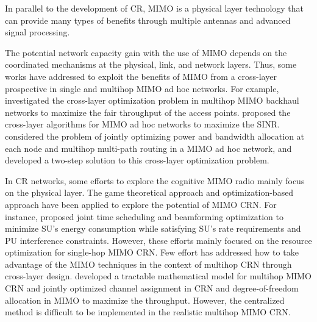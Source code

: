 \documentclass[12pt,onecolumn,tworows]{IEEEtran}
\begin{document}
In parallel to the development of CR, MIMO is a physical
layer technology that can provide many types of benefits through multiple antennas and advanced signal
processing.


The potential
network capacity gain with the use of MIMO depends on the
coordinated mechanisms at the physical, link, and network
layers\cite{Mietzner2006}. Thus, some works have addressed to exploit the benefits of MIMO from a cross-layer prospective in single and multihop MIMO ad hoc networks.
For example,
\cite{Kim2007} investigated the cross-layer optimization problem in
multihop
MIMO backhaul networks to maximize the fair throughput of the
access points.
\cite{Chu2008} proposed the cross-layer algorithms for
MIMO ad hoc networks to maximize the SINR.
\cite{LiuJSAC2008} considered the
problem of jointly optimizing power and bandwidth allocation
at each node and multihop multi-path routing in a MIMO
ad hoc network, and developed a two-step solution to this
cross-layer optimization problem.


In CR networks, some efforts to explore the cognitive MIMO radio mainly focus on the physical layer.
The game theoretical approach and optimization-based approach have been applied to explore the potential of MIMO CRN\cite{Scutari2008,Scutari2010,Bixio2010,RZhangSTSP2008,Nguyen2012,Kim2011IT,YingJunZhang2011,Ebrahim2011,JSAC2013Energy}.
For instance, \cite{JSAC2013Energy} proposed joint time scheduling and beamforming optimization to minimize SU's energy consumption while satisfying SU's rate requirements and PU interference constraints.
However, these efforts mainly focused on the resource optimization for single-hop MIMO CRN. Few effort has addressed how to take advantage of the MIMO techniques in the
context of multihop CRN through cross-layer design.
\cite{CunhaoGao2011} developed a tractable mathematical model for multihop MIMO
CRN and jointly optimized channel assignment in CRN and degree-of-freedom allocation in MIMO to maximize the throughput. However, the centralized method is difficult to be implemented in the realistic multihop MIMO CRN.
\end{document}
